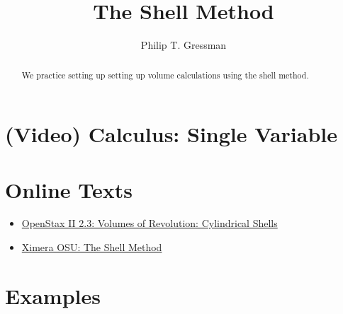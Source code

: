 \documentclass{ximera}
\title{The Shell Method}
\author{Philip T. Gressman}
\begin{document}
\begin{abstract}
We practice setting up setting up volume calculations using the shell method.
\end{abstract}
\maketitle

\section*{(Video) Calculus: Single Variable}

\section*{Online Texts}
\begin{itemize}
\item \href{https://openstax.org/books/calculus-volume-2/pages/2-3-volumes-of-revolution-cylindrical-shells}{OpenStax II 2.3: Volumes of Revolution: Cylindrical Shells}
\item \href{https://ximera.osu.edu/mooculus/calculus2/solidsOfRevolution/digInShellMethod}{Ximera OSU: The Shell Method}
\end{itemize}

\section*{Examples}
\end{document}
